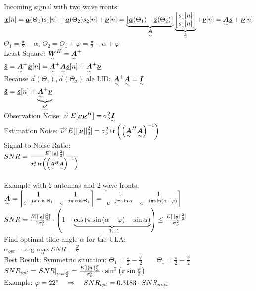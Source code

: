 Incoming signal with two wave fronts:\\
$\vec{x}[n]=\vec{a}(\Theta_1)s_1[n]+\vec{a}(\Theta_2)s_2[n]+\vec{\nu}[n]=\underbrace{\mat{\vec{a}(\Theta_1) &\vec{a}(\Theta_2)}}_{\ma{A}}
\underbrace{\mat{s_1[n]\\s_1[n]}}_{\vec{s}}+\vec{\nu}[n]=\ma{A}\vec{s}+\vec{\nu}[n]$\\
\with $\Theta_1=\frac{\pi}{2}-\alpha$; \qquad $\Theta_2=\Theta_1+\varphi=\frac{\pi}{2}-\alpha+\varphi$ \\

Least Square: $\ma{W}^H=\ma{A}^+$\\
$\vec{\hat{s}}=\ma{A}^+\vec{x}[n]=\ma{A}^+\ma{A}\vec{s}[n]+\ma{A}^+\vec{\nu}$\\
Because $\vec{a}(\Theta_1) ,\vec{a}(\Theta_2)$ ale LID: $\ma{A}^+\ma{A}=\ma{I}$\\
\pfeil $\vec{\hat{s}}=\vec{s}[n]+\underbrace{\ma{A}^+\vec{\nu}}_{\vec{\nu'}}$\\
Observation Noise: $\vec{\nu}$ \pfeil $E[\vec{\nu}\vec{\nu}^H]=\sigma_\nu^2\ma{I}$\\
Estimation Noise: $\vec{\nu}'$\pfeil $E[\abs{\abs{\vec{\nu}}}_2^2]=\sigma_\nu^2\tr\left(\left(\ma{A}^H\ma{A}\right)^{-1}\right)$\\

Signal to Noise Ratio:\\
$SNR=\frac{E[\abs{\abs{\vec{s}}}_2^2]}{\sigma_\nu^2\tr\left(\left(\ma{A}^H\ma{A}\right)^{-1}\right)}$\\

\ \\
Example with 2 antennas and 2 wave fronts:\\
$\ma{A}=\mat{1&1\\e^{-j\pi\cos\Theta_1}&e^{-j\pi\cos\Theta_1}}=
\mat{1&1\\e^{-j\pi\sin\alpha}&e^{-j\pi\sin(\alpha-\varphi)}}$\\
$SNR=\frac{E[\abs{\abs{\vec{s}}}_2^2]}{2\sigma_\nu^2}\cdot\left( 1 -
\underbrace{ \cos\left( \pi \sin \left( \alpha-\varphi\right) -\sin\alpha \right)}_{-1 ... 1} \right)\leq \frac{E[\abs{\abs{\vec{s}}}_2^2]}{\sigma_\nu^2}$\\

Find optimal tilde angle $\alpha$ for the ULA:\\
$\alpha_{opt}=\textrm{arg}\max\limits_{\alpha}SNR = \frac{\varphi}{2}$\\
Best Result: Symmetric situation: \quad $\Theta_1=\frac{\pi}{2}-\frac{\varphi}{2}\qquad\Theta_1=\frac{\pi}{2}+\frac{\varphi}{2} $\\
$SNR_{opt}=\left.  SNR \right|_{\alpha=\frac{\varphi}{2}}=
\frac{E[\abs{\abs{\vec{s}}}_2^2]}{\sigma_\nu^2}\cdot\sin^2\left(\pi \sin \frac{\varphi}{2} \right)$\\

Example: $\varphi=22^\circ \pfeil SNR_{opt}=0.3183 \cdot SNR_{max}$